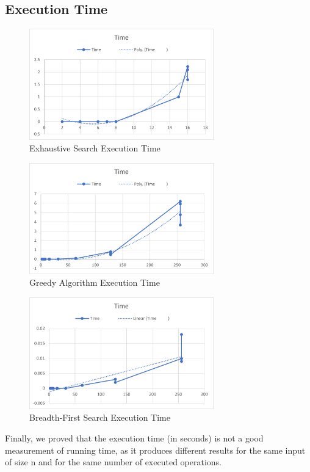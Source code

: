 \documentclass[]{revdetua}
\begin{document}
\subsection{Execution Time}

\begin{figure}[H]
    \centering
    \includegraphics[width=8cm]{Exhaustive Search/Time.png}
    \caption{Exhaustive Search Execution Time}
\end{figure}

\begin{figure}[H]
    \centering
    \includegraphics[width=8cm]{Greedy Algorithm/Time.png}
    \caption{Greedy Algorithm Execution Time}
\end{figure}


\begin{figure}[H]
    \centering
    \includegraphics[width=8cm]{Breadth-First/Time.png}
    \caption{Breadth-First Search Execution Time}
\end{figure}

Finally, we proved that the execution time (in seconds) is not a good measurement of running time, as it produces different results for the same input of size n and for the same number of executed operations.
\end{document}
